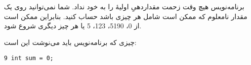 \section{}
\paragraph{}\label{answer:51}
برنامه‌نویس هیچ وقت زحمت مقداردهیِ اولیهٔ  را به خود نداد. شما نمی‌توانید روی یک مقدار نامعلوم که ممکن است شامل هر چیزی باشد حساب کنید. بنابراین  ممکن است از 0، 5190، 123، 5 یا هر چیز دیگری شروع شود.

چیزی که برنامه‌نویس باید می‌نوشت این است:
\begin{LTR}
    \begin{lstlisting}[style=C++Style]
        9 int sum = 0;
    \end{lstlisting}
\end{LTR}
